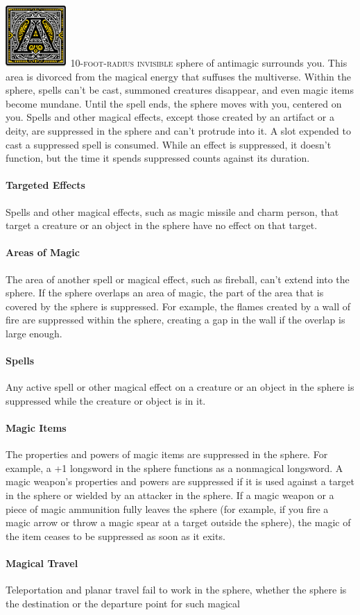 \documentclass[12pt,showtrims]{memoir}
\begin{document}
\vspace{1\baselineskip}\noindent
\lettrine[lines=4]{\includegraphics[height=66pt]{initials/A.png}}{\ 10-foot-radius invisible} sphere of antimagic surrounds you. This area is divorced from the magical energy that suffuses the multiverse. Within the sphere, spells can't be cast, summoned creatures disappear, and even magic items become mundane. Until the spell ends, the sphere moves with you, centered on you. Spells and other magical effects, except those created by an artifact or a deity, are suppressed in the sphere and can't protrude into it. A slot expended to cast a suppressed spell is consumed. While an effect is suppressed, it doesn't function, but the time it spends suppressed counts against its duration. \paragraph{Targeted Effects} Spells and other magical effects, such as magic missile and charm person, that target a creature or an object in the sphere have no effect on that target. \paragraph{Areas of Magic} The area of another spell or magical effect, such as fireball, can't extend into the sphere. If the sphere overlaps an area of magic, the part of the area that is covered by the sphere is suppressed. For example, the flames created by a wall of fire are suppressed within the sphere, creating a gap in the wall if the overlap is large enough. \paragraph{Spells} Any active spell or other magical effect on a creature or an object in the sphere is suppressed while the creature or object is in it. \paragraph{Magic Items} The properties and powers of magic items are suppressed in the sphere. For example, a +1 longsword in the sphere functions as a nonmagical longsword. A magic weapon's properties and powers are suppressed if it is used against a target in the sphere or wielded by an attacker in the sphere. If a magic weapon or a piece of magic ammunition fully leaves the sphere (for example, if you fire a magic arrow or throw a magic spear at a target outside the sphere), the magic of the item ceases to be suppressed as soon as it exits. \paragraph{Magical Travel} Teleportation and planar travel fail to work in the sphere, whether the sphere is the destination or the departure point for such magical 
\end{document}
